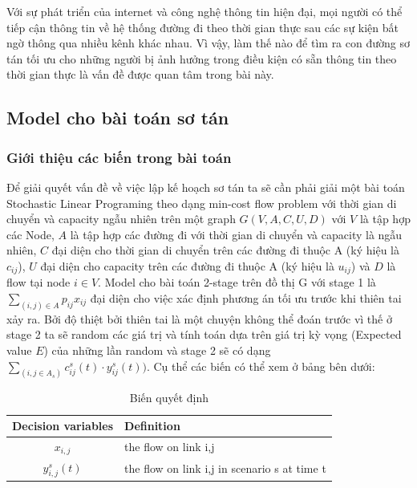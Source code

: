 \documentclass[a4paper]{article}
\begin{document}
Với sự phát triển của internet và công nghệ thông tin hiện đại, mọi người có thể tiếp cận thông tin về hệ thống đường đi theo thời gian thực sau các sự kiện bất ngờ thông qua nhiều kênh khác nhau. Vì vậy, làm thế nào để tìm ra con đường sơ tán tối ưu cho những người bị ảnh hưởng trong điều kiện có sẵn thông tin theo thời gian thực là vấn đề được quan tâm trong bài này. 
\subsection{Model cho bài toán sơ tán}
\subsubsection{Giới thiệu các biến trong bài toán}
Để giải quyết vấn đề về việc lập kế hoạch sơ tán ta sẽ cần phải giải một bài toán Stochastic Linear Programing theo dạng min-cost flow problem với thời gian di chuyển và capacity ngẫu nhiên trên một graph $G(V,A,C,U,D)$ với $V$ là tập hợp các Node, $A$ là tập hợp các đường đi với thời gian di chuyển và capacity là ngẫu nhiên, $C$ đại diện cho thời gian di chuyển trên các đường đi thuộc A (ký hiệu là $c_{ij}$), $U$ đại diện cho capacity trên các đường đi thuộc A (ký hiệu là $u_{ij}$) và $D$ là flow tại node $i \in V$. Model cho bài toán 2-stage trên đồ thị G với stage 1 là $\sum_{(i,j)\in A} p_{ij}x_{ij}$ đại diện cho việc xác định phương án tối ưu trước khi thiên tai xảy ra. Bởi độ thiệt bởi thiên tai là một chuyện không thể đoán trước vì thế ở stage 2 ta sẽ random các giá trị và tính toán dựa trên giá trị kỳ vọng (Expected value $E$) của những lần random và stage 2 sẽ có dạng $\sum_{(i,j \in A_s)}c^s_{ij}(t)\cdot y^s_{ij}(t))$. Cụ thể các biến có thể xem ở bảng bên dưới:
\begin{center}
\begin{table}[ht!]
  \centering
  \caption{Biến quyết định}
\begin{tabular}{cl}
\hline
Decision variables & Definition \\
\hline 
$x_{i,j}$& the flow on link {i,j} \\
$y_{i,j}^s (t)$ & the flow on link {i,j} in scenario s at time t\\
\hline 
\end{tabular}
\end{table}
\end{center}
\end{document}
